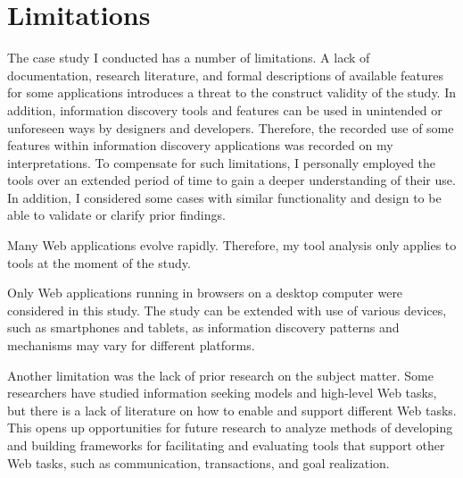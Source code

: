 {\section{Limitations}
The case study I conducted has a number of limitations. A lack of documentation, research literature, and formal descriptions of available features for some applications introduces a threat to the construct validity of the study. In addition, information discovery tools and features can be used in unintended or unforeseen ways by designers and developers. Therefore, the recorded use of some features within information discovery applications was recorded on my interpretations. To compensate for such limitations, I personally employed the tools over an extended period of time to gain a deeper understanding of their use. In addition, I considered some cases with similar functionality and design to be able to validate or clarify prior findings. 

Many Web applications evolve rapidly. Therefore, my tool analysis only applies to tools at the moment of the study.
\pagebreak

Only Web applications running in browsers on a desktop computer were considered in this study. The study can be extended with use of various devices, such as smartphones and tablets, as information discovery patterns and mechanisms may vary for different platforms. 

Another limitation was the lack of prior research on the subject matter. Some researchers have studied information seeking models and high-level Web tasks, but there is a lack of literature on how to enable and support different Web tasks. This opens up opportunities for future research to analyze methods of developing and building frameworks for facilitating and evaluating tools that support other Web tasks, such as communication, transactions, and goal realization.


} %

